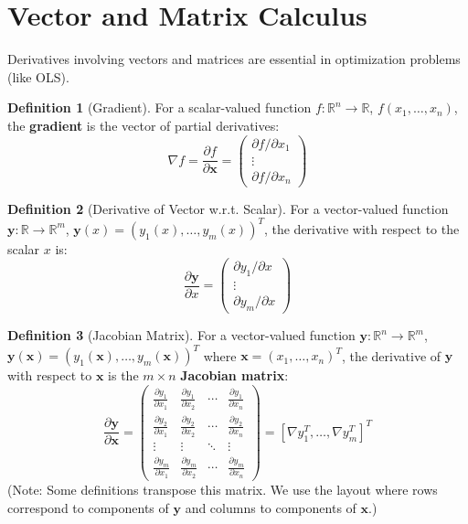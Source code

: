 \documentclass[12pt, letterpaper]{article}
\theoremstyle{definition}
\newtheorem{definition}{Definition}[section]
\newcommand{\R}{\mathbb{R}}
\newcommand{\vect}[1]{\mathbf{#1}} %
\newcommand{\x}{\vect{x}} %
\newcommand{\y}{\vect{y}} %
\begin{document}
\section{Vector and Matrix Calculus}

Derivatives involving vectors and matrices are essential in optimization problems (like OLS).

\begin{definition}[Gradient]
For a scalar-valued function $f: \R^n \to \R$, $f(x_1, \dots, x_n)$, the \textbf{gradient} is the vector of partial derivatives:
\[ \nabla f = \frac{\partial f}{\partial \x} = \begin{pmatrix} \partial f / \partial x_1 \\ \vdots \\ \partial f / \partial x_n \end{pmatrix} \]
\end{definition}

\begin{definition}[Derivative of Vector w.r.t. Scalar]
For a vector-valued function $\y: \R \to \R^m$, $\y(x) = (y_1(x), \dots, y_m(x))^T$, the derivative with respect to the scalar $x$ is:
\[ \frac{\partial \y}{\partial x} = \begin{pmatrix} \partial y_1 / \partial x \\ \vdots \\ \partial y_m / \partial x \end{pmatrix} \]
\end{definition}

\begin{definition}[Jacobian Matrix]
For a vector-valued function $\y: \R^n \to \R^m$, $\y(\x) = (y_1(\x), \dots, y_m(\x))^T$ where $\x = (x_1, \dots, x_n)^T$, the derivative of $\y$ with respect to $\x$ is the $m \times n$ \textbf{Jacobian matrix}:
\[ \frac{\partial \y}{\partial \x} = \begin{pmatrix}
\frac{\partial y_1}{\partial x_1} & \frac{\partial y_1}{\partial x_2} & \cdots & \frac{\partial y_1}{\partial x_n} \\
\frac{\partial y_2}{\partial x_1} & \frac{\partial y_2}{\partial x_2} & \cdots & \frac{\partial y_2}{\partial x_n} \\
\vdots & \vdots & \ddots & \vdots \\
\frac{\partial y_m}{\partial x_1} & \frac{\partial y_m}{\partial x_2} & \cdots & \frac{\partial y_m}{\partial x_n}
\end{pmatrix} = [\nabla y_1^T, \dots, \nabla y_m^T]^T \]
(Note: Some definitions transpose this matrix. We use the layout where rows correspond to components of $\y$ and columns to components of $\x$.)
\end{definition}
\end{document}
